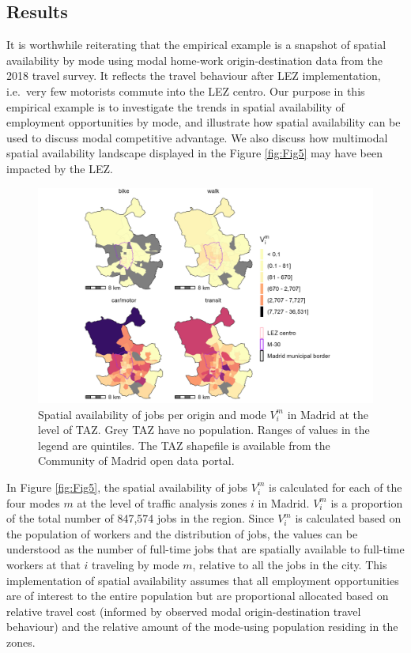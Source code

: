 \documentclass[10pt,letterpaper]{article}
\begin{document}
\hypertarget{results}{%
\subsection{Results}\label{results}}

It is worthwhile reiterating that the empirical example is a snapshot of
spatial availability by mode using modal home-work origin-destination
data from the 2018 travel survey. It reflects the travel behaviour after
LEZ implementation, i.e.~very few motorists commute into the LEZ centro.
Our purpose in this empirical example is to investigate the trends in
spatial availability of employment opportunities by mode, and illustrate
how spatial availability can be used to discuss modal competitive
advantage. We also discuss how multimodal spatial availability landscape
displayed in the Figure \ref{fig:Fig5} may have been impacted by the
LEZ.

\begin{figure}

{\centering \includegraphics[width=0.85\linewidth]{images/Fig5} 

}

\caption{\label{fig:Fig5} Spatial availability of jobs per origin and mode $V_i^m$ in Madrid at the level of TAZ. Grey TAZ have no population. Ranges of values in the legend are quintiles. The TAZ shapefile is available from the Community of Madrid open data portal.}\label{fig:SA-m-plot}
\end{figure}

In Figure \ref{fig:Fig5}, the spatial availability of jobs \(V_i^m\) is
calculated for each of the four modes \(m\) at the level of traffic
analysis zones \(i\) in Madrid. \(V_i^m\) is a proportion of the total
number of 847,574 jobs in the region. Since \(V_i^m\) is calculated
based on the population of workers and the distribution of jobs, the
values can be understood as the number of full-time jobs that are
spatially available to full-time workers at that \(i\) traveling by mode
\(m\), relative to all the jobs in the city. This implementation of
spatial availability assumes that all employment opportunities are of
interest to the entire population but are proportional allocated based
on relative travel cost (informed by observed modal origin-destination
travel behaviour) and the relative amount of the mode-using population
residing in the zones.
\end{document}
